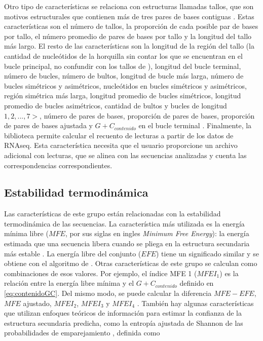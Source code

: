 Otro tipo de características se relaciona con estructuras llamadas tallos, que son motivos estructurales que contienen más de tres pares de bases contiguas
\citep{ng2007novo}. Estas características son el número de tallos, la proporción de cada posible par de bases por tallo, el número promedio de pares de bases por
tallo y la longitud del tallo más largo. El resto de las características son la longitud de la región del tallo (la cantidad de nucleótidos de la horquilla
sin contar los que se encuentran en el bucle principal, no confundir con los tallos de \cite{ng2007novo}), longitud del bucle terminal, número de bucles, número de
bultos, longitud de bucle más larga, número de bucles simétricos y asimétricos, nucleótidos en bucles simétricos y asimétricos, región simétrica más
larga, longitud promedio de bucles simétricos, longitud promedio de bucles asimétricos, cantidad de bultos y bucles de longitud $ 1,2, ..., 7>$, número de
pares de bases, proporción de pares de bases, proporción de pares de bases ajustada y $G+C_{contenido}$ en el bucle terminal \citep{Lopes2014}. Finalmente,
la biblioteca permite calcular el recuento de lecturas a partir de los datos de RNAseq. Esta característica necesita que el usuario proporcione un archivo adicional
con lecturas, que se alinea con las secuencias analizadas y cuenta las correspondencias correspondientes.

\subsection{Estabilidad termodinámica}

Las características de este grupo están relacionadas con la estabilidad termodinámica de las secuencias. La característica más utilizada es la energía
mínima libre ($MFE$, por sus siglas en ingles \textit{Minimum Free Energy}): la energía estimada que una secuencia libera cuando se pliega en la
estructura secundaria más estable \citep{zuker1981optimal}. La energía libre del conjunto ($EFE$) tiene un significado similar y se obtiene con el
algoritmo de \cite{mccaskill1990}. Otras características de este grupo se calculan como combinaciones de esos valores. Por ejemplo, el índice MFE 1
($MFEI_{1}$) es la relación entre la energía libre mínima y el ${G+C}_{contenido}$ definido en \ref{eq:contenidoGC}. Del mismo modo, se puede calcular
la diferencia $MFE-EFE$, $MFE$ ajustado, $MFEI_{2}$, $MFEI_{3}$ y $MFEI_{4}$ \citep{batuwita2009micropred}. También hay algunas características que
utilizan enfoques teóricos de información para estimar la confianza de la estructura secundaria predicha, como la entropía ajustada de Shannon de las
probabilidades de emparejamiento \citep{ng2007novo}, definida como

